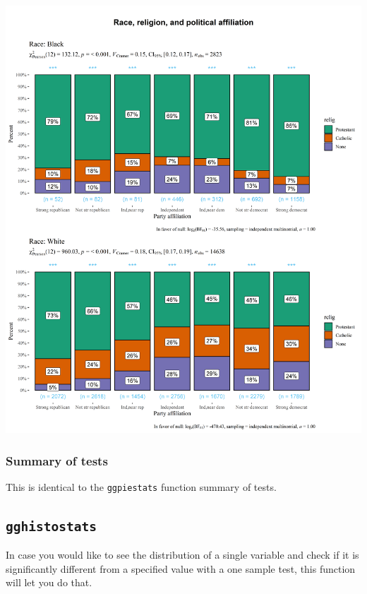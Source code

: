\documentclass[]{article}
\begin{document}
\includegraphics[width=1\linewidth]{./figures/paper-ggbarstats2-1}

\hypertarget{summary-of-tests-4}{%
\subsubsection{Summary of tests}\label{summary-of-tests-4}}

This is identical to the \texttt{ggpiestats} function summary of tests.

\hypertarget{gghistostats}{%
\subsection{\texorpdfstring{\texttt{gghistostats}}{gghistostats}}\label{gghistostats}}

In case you would like to see the distribution of a single variable and check if
it is significantly different from a specified value with a one sample test,
this function will let you do that.
\end{document}
